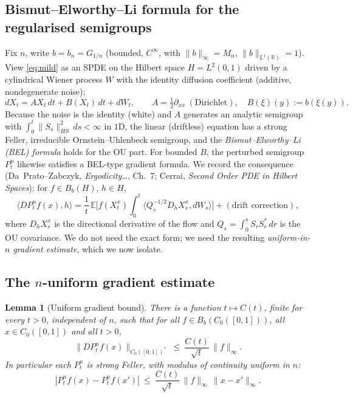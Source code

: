 \documentclass[11pt]{article}
\newtheorem{lemma}{Lemma}
\newcommand{\R}{\mathbb{R}}
\newcommand{\E}{\mathbb{E}}
\newcommand{\C}{C_0([0,1])}
\newcommand{\inner}[2]{\langle#1,#2\rangle}
\begin{document}
\subsection{Bismut--Elworthy--Li formula for the regularised semigroups}

Fix $n$, write $b=b_n=G_{1/n}$ (bounded, $C^\infty$, with $\|b\|_\infty=M_n$,
$\|b\|_{L^1(\R)}=1$). View \eqref{eq:mild} as an SPDE on the Hilbert space
$H=L^2(0,1)$ driven by a cylindrical Wiener process $W$ with the identity
diffusion coefficient (additive, nondegenerate noise):
\[
dX_t=AX_t\,dt+B(X_t)\,dt+dW_t,\qquad A=\tfrac12\partial_{xx}\ (\text{Dirichlet}),
\quad B(\xi)(y):=b(\xi(y)).
\]
Because the noise is the identity (white) and $A$ generates an analytic
semigroup with $\int_0^t\|S_s\|_{HS}^2\,ds<\infty$ in $1$D, the linear (driftless)
equation has a strong Feller, irreducible Ornstein--Uhlenbeck semigroup, and the
\emph{Bismut--Elworthy--Li (BEL) formula} holds for the OU part. For bounded
$B$, the perturbed semigroup $P^n_t$ likewise satisfies a BEL-type gradient
formula. We record the consequence (Da~Prato--Zabczyk, \emph{Ergodicity\dots},
Ch.~7; Cerrai, \emph{Second Order PDE in Hilbert Spaces}): for $f\in B_b(H)$,
$h\in H$,
\begin{equation}\label{eq:BEL}
\inner{DP^n_tf(x)}{h}
=\frac1t\,\E\Big[f(X^x_t)\int_0^t\inner{Q^{-1/2}_s D_hX^x_s}{dW_s}\Big]
+(\text{drift correction}),
\end{equation}
where $D_hX^x_s$ is the directional derivative of the flow and
$Q_s=\int_0^s S_rS_r^\ast\,dr$ is the OU covariance. We do not need the exact
form; we need the resulting \emph{uniform-in-$n$ gradient estimate}, which we now
isolate.

\subsection{The $n$-uniform gradient estimate}

\begin{lemma}[Uniform gradient bound]\label{lem:unifgrad}
There is a function $t\mapsto C(t)$, finite for every $t>0$, \emph{independent of
$n$}, such that for all $f\in B_b(\C)$, all $x\in\C$ and all $t>0$,
\begin{equation}\label{eq:gradbound}
\|DP^n_t f(x)\|_{\C^\ast}\ \le\ \frac{C(t)}{\sqrt t}\,\|f\|_\infty .
\end{equation}
In particular each $P^n_t$ is strong Feller, with modulus of continuity uniform
in $n$:
\[
|P^n_tf(x)-P^n_tf(x')|\ \le\ \frac{C(t)}{\sqrt t}\,\|f\|_\infty\,
\|x-x'\|_\infty .
\]
\end{lemma}
\end{document}
